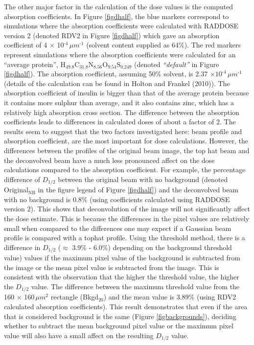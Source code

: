 The other major factor in the calculation of the dose values is the computed absorption coefficients.
In Figure \ref{figdhalf}, the blue markers correspond to simulations where the absorption coefficients were calculated with RADDOSE version 2 \cite{pait2009} (denoted RDV2 in Figure \ref{figdhalf}) which gave an absorption coefficient of 4 $\times$ 10$^{\text{-4}}\, \mu m^{\text{-1}}$ (solvent content supplied as 64\%).
The red markers represent simulations where the absorption coefficients were calculated for an ``average protein'', H$_{\text{49.8}}$C$_{\text{31.8}}$N$_{\text{8.56}}$O$_{\text{9.54}}$S$_{\text{0.249}}$ (denoted \textit{``default''} in Figure \ref{figdhalf}).
The absorption coefficient, assuming 50\% solvent, is 2.37 $\times 10^{\text{-4}}\, \mu m^{\text{-1}}$ (details of the calculation can be found in Holton and Frankel (2010)).
The absorption coefficient of insulin is bigger than that of the average protein because it contains more sulphur than average, and it also contains zinc, which has a relatively high absorption cross section.
The difference between the absorption coefficients leads to differences in calculated doses of about a factor of 2.
\newline
The results seem to suggest that the two factors investigated here: beam profile and absorption coefficient, are the most important for dose calculations.
However, the differences between the profiles of the original beam image, the top hat beam and the deconvolved beam have a much less pronounced affect on the dose calculations compared to the absorption coefficient.
For example, the percentage difference of $D_{1/2}$ between the original beam with no background (denoted Original$_{\text{NB}}$ in the figure legend of Figure \ref{figdhalf}) and the deconvolved beam with no background is 0.8\% (using coefficients calculated using RADDOSE version 2).
This shows that deconvolution of the image will not significantly affect the dose estimate.
This is because the differences in the pixel values are relatively small when compared to the differences one may expect if a Gaussian beam profile is compared with a tophat profile.
\newline
Using the threshold method, there is a difference in $D_{1/2}$ ($\approx$ 3.9\% - 6.0\%) depending on the background threshold value) values if the maximum pixel value of the background is subtracted from the image or the mean pixel value is subtracted from the image.
This is consistent with the observation that the higher the threshold value, the higher the $D_{1/2}$ value.
The difference between the maximum threshold value from the 160 $\times$ 160$\, \mu m^2$ rectangle (Bkgd$_{\text{20}}$) and the mean value is 3.89\% (using RDV2 calculated absorption coefficients).
This result demonstrates that even if the area that is considered background is the same (Figure \ref{figbackgrounds}), deciding whether to subtract the mean background pixel value or the maximum pixel value will also have a small affect on the resulting $D_{1/2}$ value.

